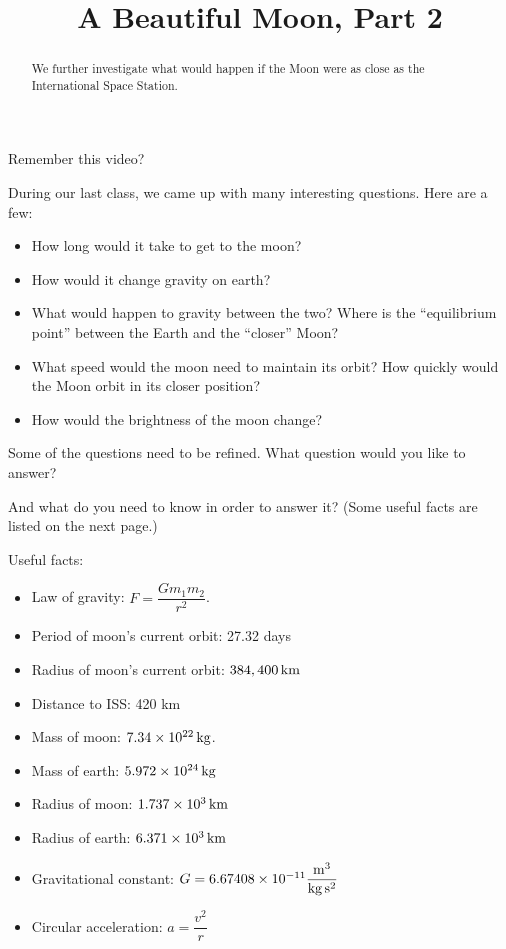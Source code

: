 \documentclass{ximera}
\title{A Beautiful Moon, Part 2}
\begin{document}
\begin{abstract}
We further investigate what would happen if the Moon were as close as the
International Space Station.
\end{abstract}
\maketitle
Remember this video?  

\begin{problem}
 During our last class, we came up with many interesting questions.   Here are a few:

\begin{itemize}
\item How long would it take to get to the moon? 
\item How would it change gravity on earth? 
\item What would happen to gravity between the two?     Where is the ``equilibrium point'' between the
   Earth and the ``closer'' Moon?
\item What speed would the moon need to maintain its orbit?   How quickly would the Moon orbit in its closer position?
\item  How would the brightness of the moon change?
 \end{itemize}

Some of the questions need to be refined.  What question would you like to answer?  

And what do you need to know in order to answer it?  (Some useful facts are listed on the next page.)  

\newpage
Useful facts:   
 
\begin{itemize}
\item Law of gravity:  $F=\dfrac{Gm_1m_2}{r^2}$.
\item Period of moon's current orbit:  27.32 days
\item Radius of moon's current orbit:  $384,400 \, \rm{km}$
\item Distance to ISS: 420 km
\item Mass of moon: $7.34\times 10^{22}\, \rm{kg}$.
\item Mass of earth: $5.972\times 10^{24}\, \rm{kg}$
\item Radius of moon: $1.737\times 10^3\, \rm{km}$
\item Radius of earth: $6.371\times 10^3\, \rm{km}$
\item Gravitational constant:  $G = 6.67408\times 10^{-11} \dfrac{\rm{m}^3}{ \rm{kg} \, \rm{ s}^2}$
\item Circular acceleration: $a=\dfrac{v^2}{r}$
\end{itemize}
 
\end{problem}
\end{document}
